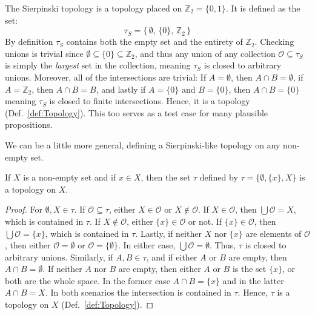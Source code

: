     \begin{example}
        The Sierpinski topology is a topology placed
        on $\mathbb{Z}_{2}=\{0,1\}$. It is defined as the set:
        \begin{equation}
            \tau_{S}=\{\,\emptyset,\,\{0\},\,\mathbb{Z}_{2}\,\}
        \end{equation}
        By definition $\tau_{S}$ contains both the empty set and the entirety of
        $\mathbb{Z}_{2}$. Checking unions is trivial since
        $\emptyset\subseteq\{0\}\subseteq\mathbb{Z}_{2}$, and thus any union of
        any collection $\mathcal{O}\subseteq\tau_{S}$ is simply the
        \textit{largest} set in the collection, meaning $\tau_{S}$ is closed to
        arbitrary unions. Moreover, all of the intersections are trivial:
        If $A=\emptyset$, then $A\cap{B}=\emptyset$, if $A=\mathbb{Z}_{2}$, then
        $A\cap{B}=B$, and lastly if $A=\{0\}$ and $B=\{0\}$, then
        $A\cap{B}=\{0\}$ meaning $\tau_{S}$ is closed to finite intersections.
        Hence, it is a topology (Def.~\ref{def:Topology}). This too serves as a
        test case for many plausible propositions.
    \end{example}
    We can be a little more general, defining a Sierpinski-like topology on any
    non-empty set.
    \begin{theorem}
        \label{thm:Existence_of_Sierpinski_Like_Topology}%
        If $X$ is a non-empty set and if $x\in{X}$, then the set $\tau$ defined
        by $\tau=\{\emptyset,\{x\},X\}$ is a topology on $X$.
    \end{theorem}
    \begin{proof}
        For $\emptyset,X\in\tau$. If $\mathcal{O}\subseteq\tau$, either
        $X\in\mathcal{O}$ or $X\notin\mathcal{O}$. If $X\in\mathcal{O}$, then
        $\bigcup\mathcal{O}=X$, which is contained in $\tau$. If
        $X\notin\mathcal{O}$, either $\{x\}\in\mathcal{O}$ or not. If
        $\{x\}\in\mathcal{O}$, then $\bigcup\mathcal{O}=\{x\}$, which is
        contained in $\tau$. Lastly, if neither $X$ nor $\{x\}$ are elements of
        $\mathcal{O}$, then either $\mathcal{O}=\emptyset$ or
        $\mathcal{O}=\{\emptyset\}$. In either case,
        $\bigcup\mathcal{O}=\emptyset$. Thus, $\tau$ is closed to arbitrary
        unions. Similarly, if $A,B\in\tau$, and if either $A$ or $B$ are empty,
        then $A\cap{B}=\emptyset$. If neither $A$ nor $B$ are empty, then
        either $A$ or $B$ is the set $\{x\}$, or both are the whole space. In
        the former case $A\cap{B}=\{x\}$ and in the latter $A\cap{B}=X$. In
        both scenarios the intersection is contained in $\tau$. Hence,
        $\tau$ is a topology on $X$ (Def.~\ref{def:Topology}).
    \end{proof}

